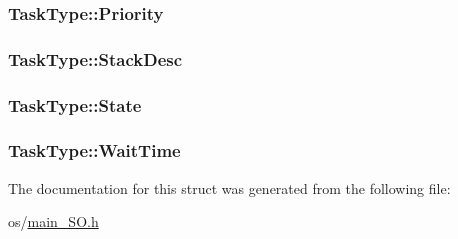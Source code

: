\subsubsection[{Priority}]{ Task\+Type\+::\+Priority}\label{struct_task_type_a927eb587d1084573c154ad3e657b3bd2}
\hypertarget{struct_task_type_a448011a1fe908f2ce2a27ce40e13bfbb}{}
\subsubsection[{Stack\+Desc}]{ Task\+Type\+::\+Stack\+Desc}\label{struct_task_type_a448011a1fe908f2ce2a27ce40e13bfbb}
\hypertarget{struct_task_type_a2a676961a53f017e2e12b3524fab55f8}{}
\subsubsection[{State}]{ Task\+Type\+::\+State}\label{struct_task_type_a2a676961a53f017e2e12b3524fab55f8}
\hypertarget{struct_task_type_adce0490006866406e48613c39eeafcad}{}
\subsubsection[{Wait\+Time}]{ Task\+Type\+::\+Wait\+Time}\label{struct_task_type_adce0490006866406e48613c39eeafcad}


The documentation for this struct was generated from the following file\+:\begin{DoxyCompactItemize}
\item 
os/\hyperlink{main___s_o_8h}{main\+\_\+\+S\+O.\+h}\end{DoxyCompactItemize}
